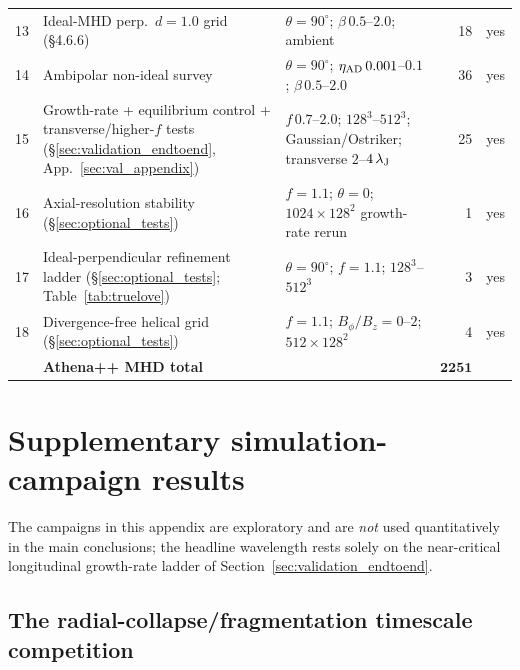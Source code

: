 \documentclass[usenatbib,twoside,twocolumn]{mnras}
\begin{document}
\begin{table}
\begin{tabular}{cllrl}
13 & Ideal-MHD perp.\ $d=1.0$ grid (\S4.6.6) & $\theta=90^\circ$; $\beta\,0.5$--$2.0$; ambient & 18 & yes \\
14 & Ambipolar non-ideal survey & $\theta=90^\circ$; $\eta_{\rm AD}\,0.001$--$0.1$; $\beta\,0.5$--$2.0$ & 36 & yes \\
15 & Growth-rate + equilibrium control + transverse/higher-$f$ tests (\S\ref{sec:validation_endtoend}, App.~\ref{sec:val_appendix}) & $f\,0.7$--$2.0$; $128^3$--$512^3$; Gaussian/Ostriker; transverse $2$--$4\,\lambda_{\rm J}$ & 25 & yes \\
16 & Axial-resolution stability (\S\ref{sec:optional_tests}) & $f=1.1$; $\theta=0$; $1024\times128^2$ growth-rate rerun & 1 & yes \\
17 & Ideal-perpendicular refinement ladder (\S\ref{sec:optional_tests}; Table~\ref{tab:truelove}) & $\theta=90^\circ$; $f=1.1$; $128^3$--$512^3$ & 3 & yes \\
18 & Divergence-free helical grid (\S\ref{sec:optional_tests}) & $f=1.1$; $B_\phi/B_z=0$--$2$; $512\times128^2$ & 4 & yes \\
\midrule
   & \textbf{Athena++ MHD total} & & $\boldsymbol{2251}$ & \\
\bottomrule
\end{tabular}
\end{table}

\section{Supplementary simulation-campaign results}
\label{sec:supplementary_campaigns_app}

The campaigns in this appendix are exploratory and are \emph{not} used quantitatively in the main conclusions; the headline wavelength rests solely on the near-critical longitudinal growth-rate ladder of Section~\ref{sec:validation_endtoend}.

\subsection{The radial-collapse/fragmentation timescale competition}
\label{sec:regimes}
\end{document}
